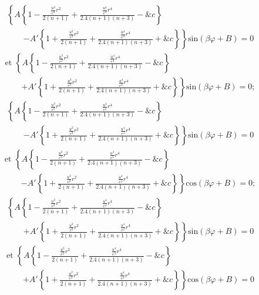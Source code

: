 \documentclass[11pt,a4paper]{article}
\begin{document}

\[ \begin{array}{l} \left\{A\left\{1 - \frac{\frac{u^2}{e^2}r^2}{2(n+1)} + \frac{\frac{u^4}{e^4}r^4}{2.4(n+1)(n+3)} - \&c\right\}\right. \\ \qquad \left. - A'\left\{1 + \frac{\frac{u^2}{e^2}r^2}{2(n+1)} + \frac{\frac{u^4}{e^4}r^4}{2.4(n+1)(n+3)} + \&c\right\}\right\}\text{sin}(\beta\varphi + B) = 0 \end{array} \]
\[ \begin{array}{l} \text{et }\left\{A\left\{1 - \frac{\frac{u^2}{e^2}r^2}{2(n+1)} + \frac{\frac{u^4}{e^4}r^4}{2.4(n+1)(n+3)} - \&c\right\}\right. \\ \qquad \left. + A'\left\{1 + \frac{\frac{u^2}{e^2}r^2}{2(n+1)} + \frac{\frac{u^4}{e^4}r^4}{2.4(n+1)(n+3)} + \&c\right\}\right\}\text{sin}(\beta\varphi + B) = 0; \end{array} \]
\[ \begin{array}{l} \left\{A\left\{1 - \frac{\frac{u^2}{e^2}r^2}{2(n+1)} + \frac{\frac{u^4}{e^4}r^4}{2.4(n+1)(n+3)} - \&c\right\}\right. \\ \qquad \left. - A'\left\{1 + \frac{\frac{u^2}{e^2}r^2}{2(n+1)} + \frac{\frac{u^4}{e^4}r^4}{2.4(n+1)(n+3)} + \&c\right\}\right\}\text{sin}(\beta\varphi + B) = 0 \end{array} \]
\[ \begin{array}{l} \text{et }\left\{A\left\{1 - \frac{\frac{u^2}{e^2}r^2}{2(n+1)} + \frac{\frac{u^4}{e^4}r^4}{2.4(n+1)(n+3)} - \&c\right\}\right. \\ \qquad \left. - A'\left\{1 + \frac{\frac{u^2}{e^2}r^2}{2(n+1)} + \frac{\frac{u^4}{e^4}r^4}{2.4(n+1)(n+3)} + \&c\right\}\right\}\text{cos}(\beta\varphi + B) = 0; \end{array} \]
\[ \begin{array}{l} \left\{A\left\{1 - \frac{\frac{u^2}{e^2}r^2}{2(n+1)} + \frac{\frac{u^4}{e^4}r^4}{2.4(n+1)(n+3)} - \&c\right\}\right. \\ \qquad \left. + A'\left\{1 + \frac{\frac{u^2}{e^2}r^2}{2(n+1)} + \frac{\frac{u^4}{e^4}r^4}{2.4(n+1)(n+3)} + \&c\right\}\right\}\text{sin}(\beta\varphi + B) = 0 \end{array} \]
\[ \begin{array}{l} \text{et }\left\{A\left\{1 - \frac{\frac{u^2}{e^2}r^2}{2(n+1)} + \frac{\frac{u^4}{e^4}r^4}{2.4(n+1)(n+3)} - \&c\right\}\right. \\ \qquad \left. + A'\left\{1 + \frac{\frac{u^2}{e^2}r^2}{2(n+1)} + \frac{\frac{u^4}{e^4}r^4}{2.4(n+1)(n+3)} + \&c\right\}\right\}\text{cos}(\beta\varphi + B) = 0 \end{array} \]
\end{document}
